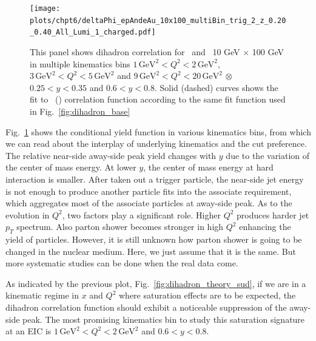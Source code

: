 \begin{figure}
\begin{center}
\texttt{[image: plots/chpt6/deltaPhi\_epAndeAu\_10x100\_multiBin\_trig\_2\_z\_0.20\_0.40\_All\_Lumi\_1\_charged.pdf]}
\end{center} 
\caption[Dihadron correlation function in multiple kinematic bins]{This panel shows dihadron correlation for \ep\ and \eAu\ 10 GeV $\times$ 100 GeV in multiple kinematics bins $1\, \textrm{GeV}^{2}<Q^{2}<2 \, \mathrm{GeV}^{2}$, $3\, \textrm{GeV}^{2}<Q^{2}<5 \,
\mathrm{GeV}^{2}$ and $9\, \textrm{GeV}^{2}<Q^{2}<20 \, \mathrm{GeV}^{2}$ $\otimes $
$0.25<y<0.35$ and $0.6<y<0.8$. Solid (dashed) curves shows the fit to
\ep\ (\eAu) correlation function according to the same fit function used in Fig.~\ref{fig:dihadron_base}}
\label{fig:dihadronMulti} 
\end{figure}

Fig.~\ref{fig:dihadronMulti} shows the conditional yield function in various
kinematics bins, from which we can read about the interplay of
underlying kinematics and the cut preference. The relative near-side away-side
peak yield changes with $y$ due to the variation of the center of mass energy. At
lower $y$, the center of mass energy at hard interaction is smaller. After taken
out a trigger particle, the near-side jet energy is not enough to produce
another particle fits into the associate requirement, which aggregates most of the associate
particles at away-side peak. As to the evolution in $Q^{2}$, two factors play a
significant role. Higher $Q^{2}$ produces harder jet $p_{T}$ spectrum. Also
parton shower becomes stronger in high $Q^{2}$ enhancing the yield of particles.
However, it is still unknown how parton shower is going to be changed in the nuclear
medium. Here, we just assume that it is the same. But more systematic
studies can be done when the real data come.


As indicated by the previous plot, Fig.~\ref{fig:dihadron_theory_sud}, if we are in a kinematic regime
in $x$ and $Q^2$ where saturation effects are to be expected, the dihadron
correlation function should exhibit a noticeable suppression of the away-side
peak. The most promising kinematics bin to study this saturation signature at an
EIC is $1\, \textrm{GeV}^{2}<Q^{2}<2 \, \mathrm{GeV}^{2}$ and $0.6<y<0.8$.

